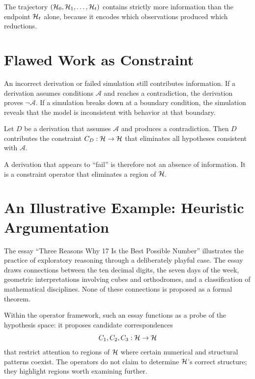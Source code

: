 \begin{proposition}
The trajectory $(\mathcal{H}_0, \mathcal{H}_1, \ldots, \mathcal{H}_t)$ contains strictly more information than the endpoint $\mathcal{H}_t$ alone, because it encodes which observations produced which reductions.
\end{proposition}

\section{Flawed Work as Constraint}

An incorrect derivation or failed simulation still contributes information. If a derivation assumes conditions $\mathcal{A}$ and reaches a contradiction, the derivation proves $\neg \mathcal{A}$. If a simulation breaks down at a boundary condition, the simulation reveals that the model is inconsistent with behavior at that boundary.

\begin{proposition}
Let $D$ be a derivation that assumes $\mathcal{A}$ and produces a contradiction. Then $D$ contributes the constraint $C_D : \mathcal{H} \to \mathcal{H}$ that eliminates all hypotheses consistent with $\mathcal{A}$.
\end{proposition}

A derivation that appears to ``fail'' is therefore not an absence of information. It is a constraint operator that eliminates a region of $\mathcal{H}$.

\section{An Illustrative Example: Heuristic Argumentation}

The essay ``Three Reasons Why 17 Is the Best Possible Number'' illustrates the practice of exploratory reasoning through a deliberately playful case. The essay draws connections between the ten decimal digits, the seven days of the week, geometric interpretations involving cubes and orthodromes, and a classification of mathematical disciplines. None of these connections is proposed as a formal theorem.

Within the operator framework, such an essay functions as a probe of the hypothesis space: it proposes candidate correspondences
\[
C_1, C_2, C_3 : \mathcal{H} \to \mathcal{H}
\]
that restrict attention to regions of $\mathcal{H}$ where certain numerical and structural patterns coexist. The operators do not claim to determine $\mathcal{H}$'s correct structure; they highlight regions worth examining further.

